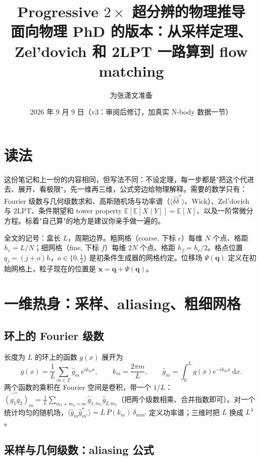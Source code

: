 \documentclass[11pt,UTF8,fontset=none]{ctexart}
\title{Progressive $2\times$ 超分辨的物理推导\\ \large 面向物理 PhD 的版本：从采样定理、Zel'dovich 和 2LPT 一路算到 flow matching}
\author{为张潇文准备}
\date{2026 年 9 月 9 日（v3：审阅后修订，加真实 N-body 数据一节）}
\newcommand{\q}{\mathbf{q}}
\newcommand{\x}{\mathbf{x}}
\newcommand{\E}{\mathbb{E}}
\newcommand{\dd}{\mathrm{d}}
\begin{document}
\maketitle

\section*{读法}

这份笔记和上一份的内容相同，但写法不同：不设定理，每一步都是"把这个代进去、展开、看极限"，先一维再三维，公式旁边给物理解释。需要的数学只有：Fourier 级数与几何级数求和、高斯随机场与功率谱（$\langle\hat\delta\hat\delta^*\rangle$、Wick）、Zel'dovich 与 2LPT、条件期望和 tower property $\E[\E[X\mid Y]]=\E[X]$、以及一阶常微分方程。标着"自己算"的地方是建议你亲手做一遍的。

全文的记号：盒长 $L$，周期边界。粗网格（coarse, 下标 $c$）每维 $N$ 个点、格距 $h_c=L/N$；细网格（fine, 下标 $f$）每维 $2N$ 个点、格距 $h_f=h_c/2$。格点位置 $q_j=(j+o)h$，$o\in\{0,\tfrac12\}$ 是初条件生成器的网格约定。位移场 $\Psi(\q)$ 定义在初始网格上，粒子现在的位置是 $\x=\q+\Psi(\q)$。

\section{一维热身：采样、aliasing、粗细网格}

\subsection{环上的 Fourier 级数}

长度为 $L$ 的环上的函数 $g(x)$ 展开为
\begin{equation}
g(x)=\frac1L\sum_{m\in\mathbb Z}\hat g_m\,e^{ik_mx},\qquad k_m=\frac{2\pi m}{L},\qquad \hat g_m=\int_0^L g(x)e^{-ik_mx}\,\dd x .
\label{eq:fs}
\end{equation}
两个函数的乘积在 Fourier 空间是卷积，带一个 $1/L$：$\widehat{(g_1g_2)}_m=\frac1L\sum_{m_1+m_2=m}\hat g_{1,m_1}\hat g_{2,m_2}$（把两个级数相乘、合并指数即可）。对一个统计均匀的随机场，$\langle\hat g_m\hat g_{m'}^*\rangle=L\,P(k_m)\,\delta_{mm'}$ 定义功率谱；三维时把 $L$ 换成 $L^3$。

\subsection{采样与几何级数：aliasing 公式}
\end{document}
